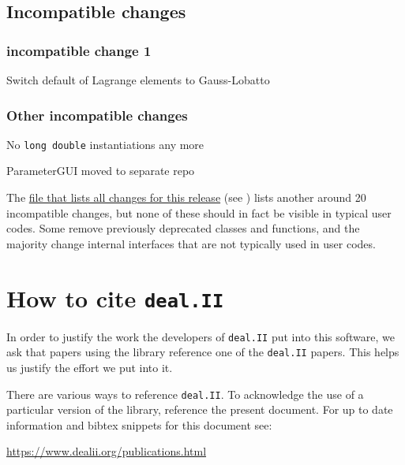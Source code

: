 \documentclass{ansarticle-preprint}
\newcommand{\specialword}[1]{\texttt{#1}}
\newcommand{\dealii}{{\specialword{deal.II}}}
\begin{document}
\subsection{Incompatible changes}

\subsubsection{incompatible change 1}

Switch default of Lagrange elements to Gauss-Lobatto

\subsubsection{Other incompatible changes}

No \texttt{long double} instantiations any more

ParameterGUI moved to separate repo

The
\href{https://www.dealii.org/8.5.0/doxygen/deal.II/changes_between_8_4_and_8_5.html}{file
  that lists all changes for this release} (see \cite{changes84})
lists another around 20
incompatible changes, but none of these should in fact be visible in
typical user codes. Some remove previously deprecated classes and
functions, and the majority change internal interfaces that are not
typically used in user codes.



\section{How to cite \dealii{}}\label{sec:cite}

In order to justify the work the developers of \dealii{} put into this
software, we ask that papers using the library reference one of the
\dealii{} papers. This helps us justify the effort we put into it.

There are various ways to reference \dealii{}. To acknowledge the use of a
particular version of the library, reference the present document. For up
to date information and bibtex snippets for this document see:
\begin{center}
 \url{https://www.dealii.org/publications.html}
\end{center}

\end{document}
